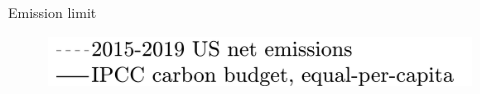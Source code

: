 \documentclass[11pt,aspectratio=169]{beamer}
\begin{document}
\begin{frame}{Emission limit}
\begin{center}
\begin{minipage}{0.6\textwidth}
\begin{figure}
		\end{figure}
	\end{minipage}
	\hspace{-10mm}
	\begin{minipage}{0.3\textwidth}
		\begin{figure}
			\includegraphics[width=1.4\textwidth]{../codding_model/own_basedOnFried/optimalPol_010922_revision/figures/all_13Sept22_Tplus30/Emnet_goals_Legend_cropped_o0.png}
		\end{figure}
	\end{minipage}
\end{center}
\end{frame}
\end{document}

